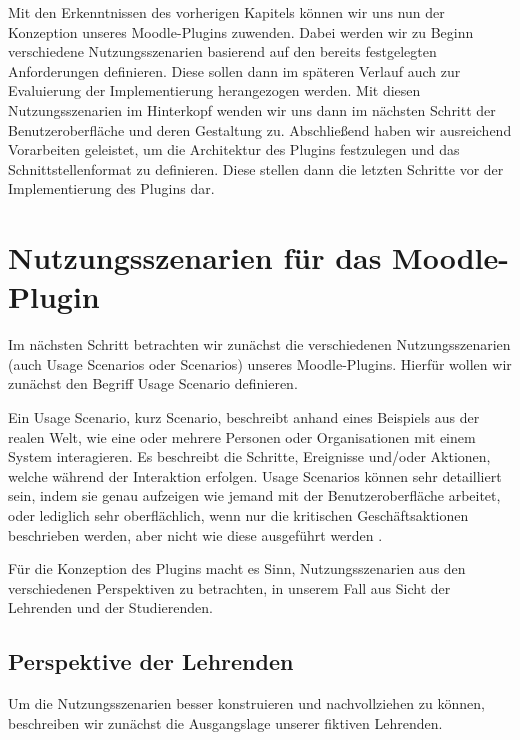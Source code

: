 Mit den Erkenntnissen des vorherigen Kapitels können wir uns nun der Konzeption unseres Moodle-Plugins zuwenden. Dabei werden wir zu Beginn verschiedene Nutzungsszenarien basierend auf den bereits festgelegten Anforderungen definieren. Diese sollen dann im späteren Verlauf auch zur Evaluierung der Implementierung herangezogen werden. Mit diesen Nutzungsszenarien im Hinterkopf wenden wir uns dann im nächsten Schritt der Benutzeroberfläche und deren Gestaltung zu. Abschließend haben wir ausreichend Vorarbeiten geleistet, um die Architektur des Plugins festzulegen und das Schnittstellenformat zu definieren. Diese stellen dann die letzten Schritte vor der Implementierung des Plugins dar.

\section{Nutzungsszenarien für das Moodle-Plugin}
Im nächsten Schritt betrachten wir zunächst die verschiedenen Nutzungsszenarien (auch Usage Scenarios oder Scenarios) unseres Moodle-Plugins. Hierfür wollen wir zunächst den Begriff Usage Scenario definieren.

\glqq Ein Usage Scenario, kurz Scenario, beschreibt anhand eines Beispiels aus der realen Welt, wie eine oder mehrere Personen oder Organisationen mit einem System interagieren.
Es beschreibt die Schritte, Ereignisse und/oder Aktionen, welche während der Interaktion erfolgen.
Usage Scenarios können sehr detailliert sein, indem sie genau aufzeigen wie jemand mit der Benutzeroberfläche arbeitet, oder lediglich sehr oberflächlich, wenn nur die kritischen Geschäftsaktionen beschrieben werden, aber nicht wie diese ausgeführt werden\grqq{} \citep{agilemodeling2018stat}.


Für die Konzeption des Plugins macht es Sinn, Nutzungsszenarien aus den verschiedenen Perspektiven zu betrachten, in unserem Fall aus Sicht der Lehrenden und der Studierenden.


\subsection{Perspektive der Lehrenden}
Um die Nutzungsszenarien besser konstruieren und nachvollziehen zu können, beschreiben wir zunächst die Ausgangslage unserer fiktiven Lehrenden.

